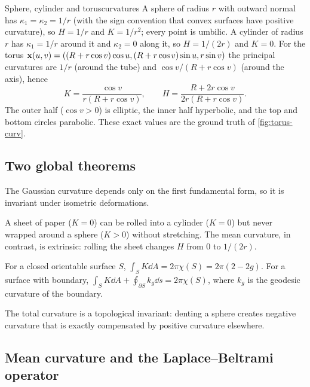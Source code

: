 \begin{example}{Sphere, cylinder and torus}{curvatures}
A sphere of radius $r$ with outward normal has $\kappa_1=\kappa_2=1/r$ (with the sign convention
that convex surfaces have positive curvature), so $H=1/r$ and $K=1/r^2$; every point is umbilic. A
cylinder of radius $r$ has $\kappa_1=1/r$ around it and $\kappa_2=0$ along it, so $H=1/(2r)$ and
$K=0$. For the torus $\mathbf{x}(u,v)=((R+r\cos v)\cos u,(R+r\cos v)\sin u,r\sin v)$ the principal
curvatures are $1/r$ (around the tube) and $\cos v/(R+r\cos v)$ (around the axis), hence
\begin{equation}
K=\frac{\cos v}{r(R+r\cos v)},\qquad H=\frac{R+2r\cos v}{2r(R+r\cos v)} .
\end{equation}
The outer half ($\cos v>0$) is elliptic, the inner half hyperbolic, and the top and bottom circles
parabolic. These exact values are the ground truth of \cref{fig:torus-curv}.
\end{example}

\subsection{Two global theorems}

\begin{theorem}
The Gaussian curvature depends only on the first fundamental form, so it is invariant under
isometric deformations.
\end{theorem}
A sheet of paper ($K=0$) can be rolled into a cylinder ($K=0$) but never wrapped around a sphere
($K>0$) without stretching. The mean curvature, in contrast, is extrinsic: rolling the sheet
changes $H$ from $0$ to $1/(2r)$.

\begin{theorem}
For a closed orientable surface $S$, $\displaystyle\int_SK\dd A=2\pi\chi(S)=2\pi(2-2g)$. For a
surface with boundary, $\displaystyle\int_SK\dd A+\oint_{\partial S}k_g\dd s=2\pi\chi(S)$, where
$k_g$ is the geodesic curvature of the boundary.
\end{theorem}
The total curvature is a topological invariant: denting a sphere creates negative curvature that is
exactly compensated by positive curvature elsewhere.

\subsection{Mean curvature and the Laplace--Beltrami operator}

